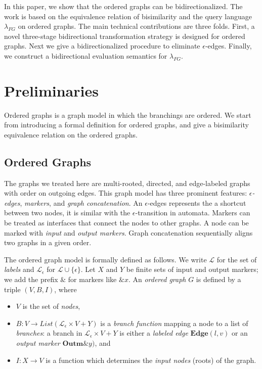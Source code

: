 \documentclass{llncs}
\begin{document}
In this paper, we show that the ordered graphs can be bidirectionalized. The work is based on the equivalence relation of bisimilarity and the query language $\lambda_{FG}$ on ordered graphs. The main technical contributions are three folds. First, a novel three-stage bidirectional transformation strategy is designed for ordered graphs. Next we give a bidirectionalized procedure to eliminate $\epsilon$-edges. Finally, we construct a bidirectional evaluation semantics for $\lambda_{FG}$. 

\section{Preliminaries}\label{sec:pre}

Ordered graphs is a graph model in which the branchings are ordered. We start from introducing a formal definition for ordered graphs, and give a bisimilarity equivalence relation on the ordered graphs.

\subsection{Ordered Graphs}\label{subsec:order-graph}

The graphs we treated here are multi-rooted, directed, and edge-labeled graphs with order on outgoing edges. This graph model has three prominent features: \emph{$\epsilon$-edges}, \emph{markers}, and \emph{graph concatenation}. An $\epsilon$-edges represents the a shortcut between two nodes, it is similar with the $\epsilon$-transition in automata. Markers can be treated as interfaces that connect the nodes to other graphs. A node can be marked with \emph{input} and \emph{output markers}. Graph concatenation sequentially aligns two graphs in a given order.

The ordered graph model is formally defined as follows. We write $\mathcal{L}$ for the set of \emph{labels} and $\mathcal{L}_{\epsilon}$ for $\mathcal{L}\cup\{\epsilon\}$. Let $X$ and $Y$ be finite sets of input and output markers; we add the prefix $\&$ for markers like $\& x$.
    An \emph{ordered graph} $G$ is defined by a triple $(V,B,I)$, where
    \begin{itemize}
        \item $V$ is the set of \emph{nodes},
        \item $B:V\rightarrow List(\mathcal{L}_{\epsilon}\times V+Y)$ is a \emph{branch function} mapping a node to a list of \emph{branches}: a branch in $\mathcal{L}_{\epsilon}\times V+Y$ is either a \emph{labeled edge} $\mathbf{Edge}(l,v)$ or an \emph{output marker} $\mathbf{Outm}\&y)$, and
        \item $I:X \rightarrow V$ is a function which determines the \emph{input nodes} (roots) of the graph.
    \end{itemize}
\end{document}
